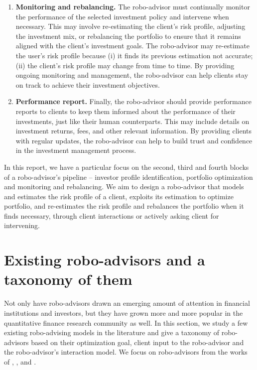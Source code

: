 \begin{enumerate}
    \item \textbf{Monitoring and rebalancing.} The robo-advisor must continually monitor the performance of the selected investment policy and intervene when necessary. This may involve re-estimating the client's risk profile, adjusting the investment mix, or rebalancing the portfolio to ensure that it remains aligned with the client's investment goals. The robo-advisor may re-estimate the user’s risk profile because (i) it finds its previous estimation not accurate; (ii) the client’s risk profile may change from time to time. By providing ongoing monitoring and management, the robo-advisor can help clients stay on track to achieve their investment objectives. 

    \item \textbf{Performance report.} Finally, the robo-advisor should provide performance reports to clients to keep them informed about the performance of their investments, just like their human counterparts. This may include details on investment returns, fees, and other relevant information. By providing clients with regular updates, the robo-advisor can help to build trust and confidence in the investment management process.
\end{enumerate}

In this report, we have a particular focus on the second, third and fourth blocks of a robo-advisor's pipeline -- investor profile identification, portfolio optimization and monitoring and rebalancing. We aim to design a robo-advisor that models and estimates the risk profile of a client, exploits its estimation to optimize portfolio, and re-estimates the risk profile and rebalances the portfolio when it finds necessary, through client interactions or actively asking client for intervening.

\section{Existing robo-advisors and a taxonomy of them}
Not only have robo-advisors drawn an emerging amount of attention in financial institutions and investors, but they have grown more and more popular in the quantitative finance research community as well. In this section, we study a few existing robo-advising models in the literature and give a taxonomy of robo-advisors based on their optimization goal, client input to the robo-advisor and the robo-advisor's interaction model. We focus on robo-advisors from the works of , ,  and .

